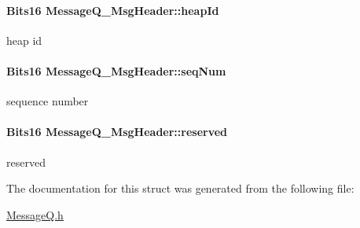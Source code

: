 \paragraph[{heapId}]{\setlength{\rightskip}{0pt plus 5cm}Bits16 {\bf MessageQ\_\-MsgHeader::heapId}}\hfill\label{struct_message_q___msg_header_a4281bf0f37f64a9c5e580f0abc3536eb}
heap id 
\paragraph[{seqNum}]{\setlength{\rightskip}{0pt plus 5cm}Bits16 {\bf MessageQ\_\-MsgHeader::seqNum}}\hfill\label{struct_message_q___msg_header_afcef65b2eebc0e508363870743706909}
sequence number 
\paragraph[{reserved}]{\setlength{\rightskip}{0pt plus 5cm}Bits16 {\bf MessageQ\_\-MsgHeader::reserved}}\hfill\label{struct_message_q___msg_header_a66d4a1e8d4a20da8bad4feca1c710e53}
reserved 

The documentation for this struct was generated from the following file:\begin{DoxyCompactItemize}
\item 
\hyperlink{_message_q_8h}{MessageQ.h}\end{DoxyCompactItemize}
